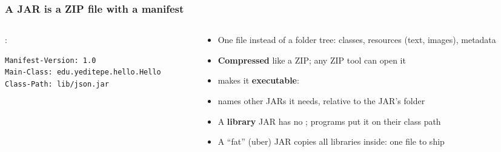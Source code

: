 \documentclass[aspectratio=169,10pt,compress]{beamer}
\begin{document}
\begin{frame}[t,fragile] \frametitle{A JAR is a ZIP file with a manifest}
  \begin{columns}[T]
    \begin{column}{0.46\textwidth}
      \vspace{0.3em}

      \small {}:


\begin{lstlisting}[style=codesnippet, language={}, basicstyle=\ttfamily\scriptsize]
Manifest-Version: 1.0
Main-Class: edu.yeditepe.hello.Hello
Class-Path: lib/json.jar
\end{lstlisting}


    \end{column}
    \begin{column}{0.5\textwidth}
      \begin{itemize}\small
        \item One file instead of a folder tree: classes, resources (text, images), metadata
        \item \textbf{Compressed} like a ZIP; any ZIP tool can open it
        \item {} makes it \textbf{executable}: 
        \item {} names other JARs it needs, relative to the JAR's folder
        \item A \textbf{library} JAR has no ; programs put it on their class path
        \item A ``fat'' (uber) JAR copies all libraries inside: one file to ship
      \end{itemize}
    \end{column}
  \end{columns}
\end{frame}
\end{document}
